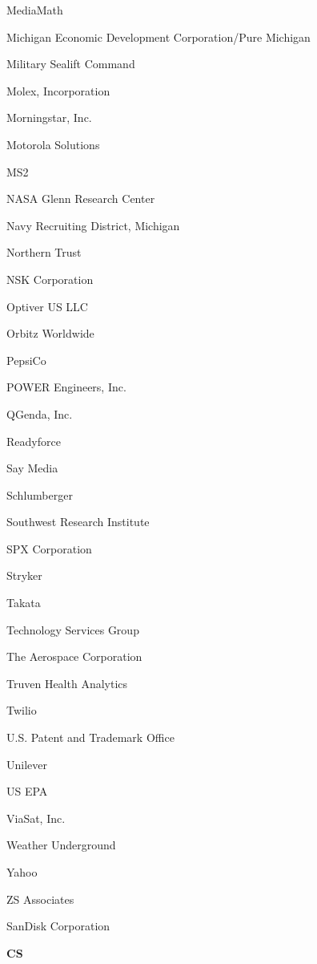 \documentclass[twoside]{article}
\begin{document}
\begin{center}
\begin{multicols}{5}
\begin{FlushLeft}
\begin{compactitem}
\item MediaMath
\item Michigan Economic Development Corporation/Pure Michigan
\item Military Sealift Command
\item Molex, Incorporation
\item Morningstar, Inc.
\item Motorola Solutions
\item MS2
\item NASA Glenn Research Center
\item Navy Recruiting District, Michigan
\item Northern Trust
\item NSK Corporation
\item Optiver US LLC
\item Orbitz Worldwide
\item PepsiCo
\item POWER Engineers, Inc.
\item QGenda, Inc.
\item Readyforce
\item Say Media
\item Schlumberger
\item Southwest Research Institute
\item SPX Corporation
\item Stryker
\item Takata
\item Technology Services Group
\item The Aerospace Corporation
\item Truven Health Analytics
\item Twilio
\item U.S. Patent and Trademark Office
\item Unilever
\item US EPA
\item ViaSat, Inc.
\item Weather Underground
\item Yahoo
\item ZS Associates
\item SanDisk Corporation
\end{compactitem}
        \end{FlushLeft}
        \vspace{1em}
        {\fontsize{14}{16}\selectfont \bf CS}\\
        \vspace{-1em}
        ~\hrulefill~
        \vspace{-.9em}

\end{multicols}
\end{center}
\end{document}
